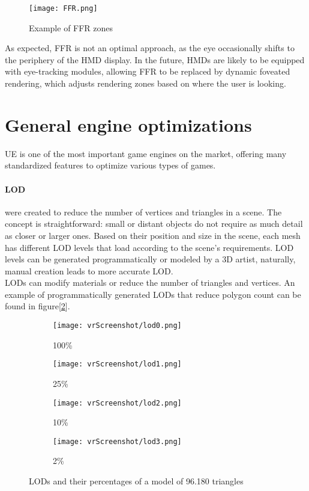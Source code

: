 \begin{figure}[ht]
  \centering
  \texttt{[image: FFR.png]}
  \caption{Example of FFR zones}
  \label{fig:FFR}
\end{figure}

\noindent
As expected, \ac{FFR} is not an optimal approach, as the eye occasionally shifts to the periphery of the \ac{HMD} display.
In the future, \ac{HMD}s are likely to be equipped with eye-tracking modules, allowing \ac{FFR} to be replaced by dynamic foveated rendering, which adjusts rendering zones based on where the user is looking.

\section{General engine optimizations}
\noindent
\ac{UE} is one of the most important game engines on the market, offering many standardized features to optimize various types of games.

\paragraph{\ac{LOD}}
were created to reduce the number of vertices and triangles in a scene.
The concept is straightforward: small or distant objects do not require as much detail as closer or larger ones. 
Based on their position and size in the scene, each mesh has different \ac{LOD} levels that load according to the scene's requirements.
\ac{LOD} levels can be generated programmatically or modeled by a 3D artist, naturally, manual creation leads to more accurate \ac{LOD}.\\
\ac{LOD}s can modify materials or reduce the number of triangles and vertices. An example of programmatically generated \ac{LOD}s that reduce polygon count can be found in figure[\ref{fig:lods}].

\captionsetup[subfigure]{labelformat=empty}
\begin{figure}[h]
  \centering
  \begin{subfigure}{0.24\textwidth}
      \texttt{[image: vrScreenshot/lod0.png]}
      \caption{100\%}
  \end{subfigure}
  \begin{subfigure}{0.24\textwidth}
      \texttt{[image: vrScreenshot/lod1.png]}
      \caption{25\%}
  \end{subfigure}
  \begin{subfigure}{0.24\textwidth}
      \texttt{[image: vrScreenshot/lod2.png]}
      \caption{10\%}
  \end{subfigure}
  \begin{subfigure}{0.24\textwidth}
      \texttt{[image: vrScreenshot/lod3.png]}
      \caption{2\%}
  \end{subfigure}
  \caption{LODs and their percentages of a model of 96.180 triangles}
  \label{fig:lods}
\end{figure}

